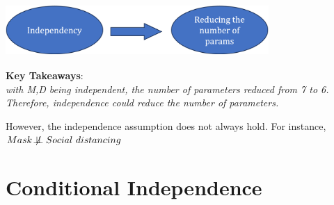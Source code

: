 \documentclass[11pt,a4paper]{report}
\begin{document}
\begin{center}
    \includegraphics[width=10cm, height=2cm]{indep_red.png}
\end{center}

\textbf{\color{blue}Key Takeaways}: \\ \textit{\color{blue}with M,D being independent, the number of parameters reduced from 7 to 6. Therefore, independence could reduce the number of parameters.}

However, the independence assumption does not always hold. For instance, $Mask \not\!\perp\!\!\!\perp Social\ distancing$ 


\section{Conditional Independence}
\end{document}
